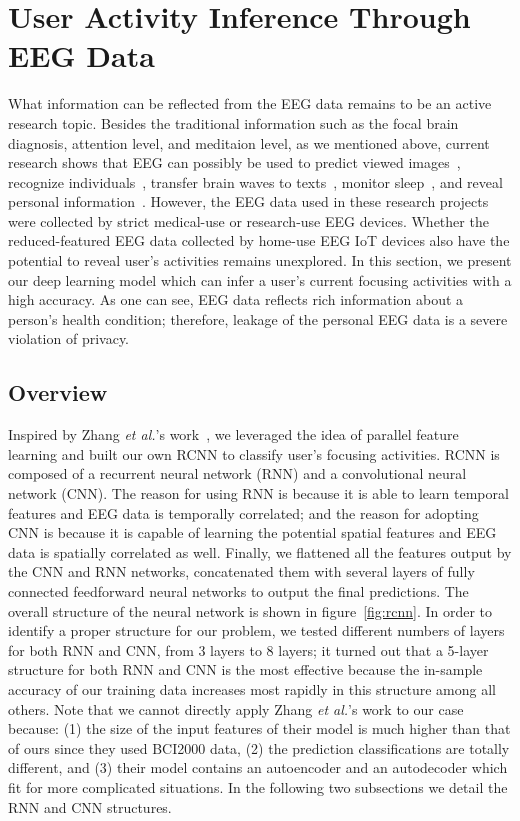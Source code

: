 \section{User Activity Inference Through EEG Data}
\label{sec:inference}

What information can be reflected from the EEG data remains to be an active research topic. Besides the traditional information such as the focal brain diagnosis, attention level, and meditaion level, as we mentioned above, current research shows that EEG can possibly be used to predict viewed images~\cite{mindreading2017}, recognize individuals~\cite{chu2017individual}, transfer brain waves to texts~\cite{zhang2017converting}, monitor sleep~\cite{nakamura2017automatic},  and reveal personal information~\cite{martinovic2012feasibility}. However, the EEG data used in these research projects were collected by strict medical-use or research-use EEG devices. Whether the reduced-featured EEG data collected by home-use EEG IoT devices also have the potential to reveal user's activities remains unexplored. In this section, we present our deep learning model which can infer a user's current focusing activities with a high accuracy. As one can see, EEG data reflects rich information about a person's health condition; therefore, leakage of the personal EEG data is a severe violation of privacy.

\subsection{Overview}
Inspired by Zhang \emph{et al.}'s work~\cite{zhang2017converting,hochreiter1997long}, we leveraged the idea of parallel feature learning and built our own RCNN to classify user's focusing activities. RCNN is composed of a recurrent neural network (RNN) and a convolutional neural network (CNN). The reason for using RNN is because it is able to learn temporal features and EEG data is temporally correlated; and the reason for adopting CNN is because it is capable of learning the potential spatial features and EEG data is spatially correlated as well. Finally, we flattened all the features output by the CNN and RNN networks, concatenated them with several layers of fully connected feedforward neural networks to output the final predictions. The overall structure of the neural network is shown in figure~\ref{fig:rcnn}. In order to identify a proper structure for our problem, we tested different numbers of layers for both RNN and CNN, from 3 layers to 8 layers; it turned out that a 5-layer structure for both RNN and CNN is the most effective because the in-sample accuracy of our training data increases most rapidly in this structure among all others. Note that we cannot directly apply Zhang \emph{et al.}'s work to our case because: (1) the size of the input features of their model is much higher than that of ours since they used BCI2000 data, (2) the prediction classifications are totally different, and (3) their model contains an autoencoder and an autodecoder which fit for more complicated situations. %
In the following two subsections we detail the RNN and CNN structures. 

